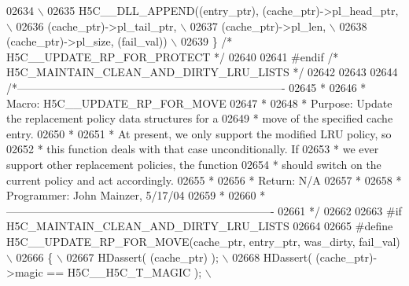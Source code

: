 \begin{DoxyCode}
02634 \textcolor{preprocessor}{                                                                          \(\backslash\)}
02635 \textcolor{preprocessor}{    H5C\_\_DLL\_APPEND((entry\_ptr), (cache\_ptr)->pl\_head\_ptr,                \(\backslash\)}
02636 \textcolor{preprocessor}{                    (cache\_ptr)->pl\_tail\_ptr,                             \(\backslash\)}
02637 \textcolor{preprocessor}{                    (cache\_ptr)->pl\_len,                                  \(\backslash\)}
02638 \textcolor{preprocessor}{                    (cache\_ptr)->pl\_size, (fail\_val))                     \(\backslash\)}
02639 \textcolor{preprocessor}{\} }\textcolor{comment}{/* H5C\_\_UPDATE\_RP\_FOR\_PROTECT */}\textcolor{preprocessor}{}
02640 
02641 \textcolor{preprocessor}{#endif }\textcolor{comment}{/* H5C\_MAINTAIN\_CLEAN\_AND\_DIRTY\_LRU\_LISTS */}\textcolor{preprocessor}{}
02642 
02643 
02644 \textcolor{comment}{/*-------------------------------------------------------------------------}
02645 \textcolor{comment}{ *}
02646 \textcolor{comment}{ * Macro:   H5C\_\_UPDATE\_RP\_FOR\_MOVE}
02647 \textcolor{comment}{ *}
02648 \textcolor{comment}{ * Purpose:     Update the replacement policy data structures for a}
02649 \textcolor{comment}{ *      move of the specified cache entry.}
02650 \textcolor{comment}{ *}
02651 \textcolor{comment}{ *      At present, we only support the modified LRU policy, so}
02652 \textcolor{comment}{ *      this function deals with that case unconditionally.  If}
02653 \textcolor{comment}{ *      we ever support other replacement policies, the function}
02654 \textcolor{comment}{ *      should switch on the current policy and act accordingly.}
02655 \textcolor{comment}{ *}
02656 \textcolor{comment}{ * Return:      N/A}
02657 \textcolor{comment}{ *}
02658 \textcolor{comment}{ * Programmer:  John Mainzer, 5/17/04}
02659 \textcolor{comment}{ *}
02660 \textcolor{comment}{ *-------------------------------------------------------------------------}
02661 \textcolor{comment}{ */}
02662 
02663 \textcolor{preprocessor}{#if H5C\_MAINTAIN\_CLEAN\_AND\_DIRTY\_LRU\_LISTS}
02664 
02665 \textcolor{preprocessor}{#define H5C\_\_UPDATE\_RP\_FOR\_MOVE(cache\_ptr, entry\_ptr, was\_dirty, fail\_val) \(\backslash\)}
02666 \textcolor{preprocessor}{\{                                                                            \(\backslash\)}
02667 \textcolor{preprocessor}{    HDassert( (cache\_ptr) );                                                 \(\backslash\)}
02668 \textcolor{preprocessor}{    HDassert( (cache\_ptr)->magic == H5C\_\_H5C\_T\_MAGIC );                      \(\backslash\)}

\end{DoxyCode}

